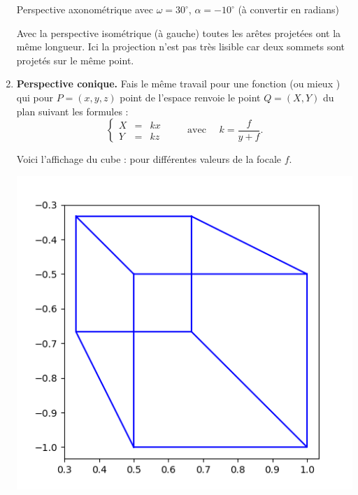 \documentclass[11pt,class=report,crop=false]{standalone}
\begin{document}
\begin{activite}[Perspective]
\begin{enumerate}
\begin{center}
\begin{minipage}{0.45\textwidth}
\begin{center}
		Perspective axonométrique avec $\omega=30^\circ$, $\alpha=-10^\circ$ (à convertir en radians)
	\end{center}
	\end{minipage}
	\end{center}

	Avec la perspective isométrique (à gauche) toutes les arêtes projetées ont la même longueur. Ici la projection n'est pas très lisible car deux sommets sont projetés sur le même point.
  
  
   \item \textbf{Perspective conique.} 
   Fais le même travail pour une fonction 
   (ou mieux  ) qui pour $P = (x,y,z)$ point de l'espace renvoie le point 
   $Q = (X,Y)$ du plan suivant les formules :
   $$\left\{
	\begin{array}{rcl}
	X &=& kx \\
	Y &=& kz
	\end{array}
	\right.  \qquad \text{ avec } \quad k = \frac{f}{y+f}.$$ 
	
	Voici l'affichage du cube :
	pour différentes valeurs de la focale $f$.
	\begin{center}
	\begin{minipage}{0.2\textwidth}
	\begin{center}
		\includegraphics[scale=\myscale,scale=0.25]{ecran-perspective-6-1}
			

\end{center}
\end{minipage}
\end{center}
\end{enumerate}
\end{activite}
\end{document}

